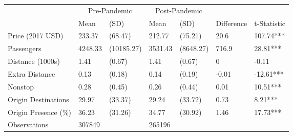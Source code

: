 
\begin{tabular}[t]{lllllll}
\toprule
\multicolumn{1}{c}{ } & \multicolumn{2}{c}{Pre-Pandemic} & \multicolumn{2}{c}{Post-Pandemic} & \multicolumn{2}{c}{ } \\
\cmidrule(l{3pt}r{3pt}){2-3} \cmidrule(l{3pt}r{3pt}){4-5}
 & Mean & (SD) & Mean & (SD) & Difference & t-Statistic\\
\midrule
Price (2017 USD) & 233.37 & (68.47) & 212.77 & (75.21) & 20.6 & 107.74***\\
Passengers & 4248.33 & (10185.27) & 3531.43 & (8648.27) & 716.9 & 28.81***\\
Distance (1000s) & 1.41 & (0.67) & 1.41 & (0.67) & 0 & -0.11\\
Extra Distance & 0.13 & (0.18) & 0.14 & (0.19) & -0.01 & -12.61***\\
Nonstop & 0.28 & (0.45) & 0.26 & (0.44) & 0.01 & 10.51***\\
\addlinespace
Origin Destinations & 29.97 & (33.37) & 29.24 & (33.72) & 0.73 & 8.21***\\
Origin Presence (\%) & 36.23 & (31.26) & 34.77 & (30.92) & 1.46 & 17.73***\\
Observations & 307849 &  & 265196 &  &  & \\
\bottomrule
\end{tabular}
